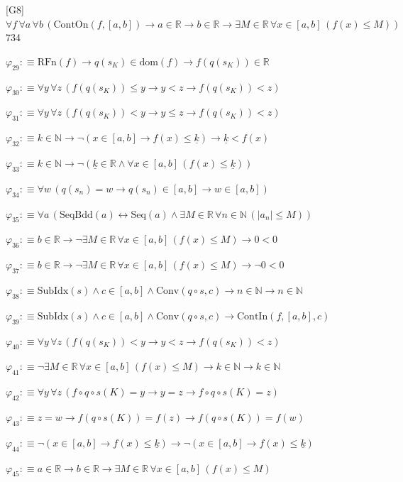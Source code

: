 \begin{fullproof}{[G8]}{$\forall f\,\forall a\,\forall b\,(\mathrm{ContOn}(f,[a,b]) \to a \in \mathbb{R} \to b \in \mathbb{R} \to \exists M \in \mathbb{R}\,\forall x \in [a,b]\,(f(x) \leq M))$}{734}
\begin{abbrevlist}
\item $\varphi_{29} :\equiv \mathrm{RFn}(f) \to q(s_{K}) \in \mathrm{dom}(f) \to f(q(s_{K})) \in \mathbb{R}$
\item $\varphi_{30} :\equiv \forall y\,\forall z\,(f(q(s_{K})) \leq y \to y < z \to f(q(s_{K})) < z)$
\item $\varphi_{31} :\equiv \forall y\,\forall z\,(f(q(s_{K})) < y \to y \leq z \to f(q(s_{K})) < z)$
\item $\varphi_{32} :\equiv k \in \mathbb{N} \to \neg (x \in [a,b] \to f(x) \leq \underline{k}) \to \underline{k} < f(x)$
\item $\varphi_{33} :\equiv k \in \mathbb{N} \to \neg (\underline{k} \in \mathbb{R} \land \forall x \in [a,b]\,(f(x) \leq \underline{k}))$
\item $\varphi_{34} :\equiv \forall w\,(q(s_{n}) = w \to q(s_{n}) \in [a,b] \to w \in [a,b])$
\item $\varphi_{35} :\equiv \forall a\,(\mathrm{SeqBdd}(a) \leftrightarrow \mathrm{Seq}(a) \land \exists M \in \mathbb{R}\,\forall n \in \mathbb{N}\,(\lvert a_{n} \rvert \leq M))$
\item $\varphi_{36} :\equiv b \in \mathbb{R} \to \neg \exists M \in \mathbb{R}\,\forall x \in [a,b]\,(f(x) \leq M) \to 0 < 0$
\item $\varphi_{37} :\equiv b \in \mathbb{R} \to \neg \exists M \in \mathbb{R}\,\forall x \in [a,b]\,(f(x) \leq M) \to \neg 0 < 0$
\item $\varphi_{38} :\equiv \mathrm{SubIdx}(s) \land c \in [a,b] \land \mathrm{Conv}(q \circ s,c) \to n \in \mathbb{N} \to n \in \mathbb{N}$
\item $\varphi_{39} :\equiv \mathrm{SubIdx}(s) \land c \in [a,b] \land \mathrm{Conv}(q \circ s,c) \to \mathrm{ContIn}(f,[a,b],c)$
\item $\varphi_{40} :\equiv \forall y\,\forall z\,(f(q(s_{K})) < y \to y < z \to f(q(s_{K})) < z)$
\item $\varphi_{41} :\equiv \neg \exists M \in \mathbb{R}\,\forall x \in [a,b]\,(f(x) \leq M) \to k \in \mathbb{N} \to k \in \mathbb{N}$
\item $\varphi_{42} :\equiv \forall y\,\forall z\,(f \circ q \circ s(K) = y \to y = z \to f \circ q \circ s(K) = z)$
\item $\varphi_{43} :\equiv z = w \to f(q \circ s(K)) = f(z) \to f(q \circ s(K)) = f(w)$
\item $\varphi_{44} :\equiv \neg (x \in [a,b] \to f(x) \leq \underline{k}) \to \neg (x \in [a,b] \to f(x) \leq \underline{k})$
\item $\varphi_{45} :\equiv a \in \mathbb{R} \to b \in \mathbb{R} \to \exists M \in \mathbb{R}\,\forall x \in [a,b]\,(f(x) \leq M)$

\end{abbrevlist}
\end{fullproof}
